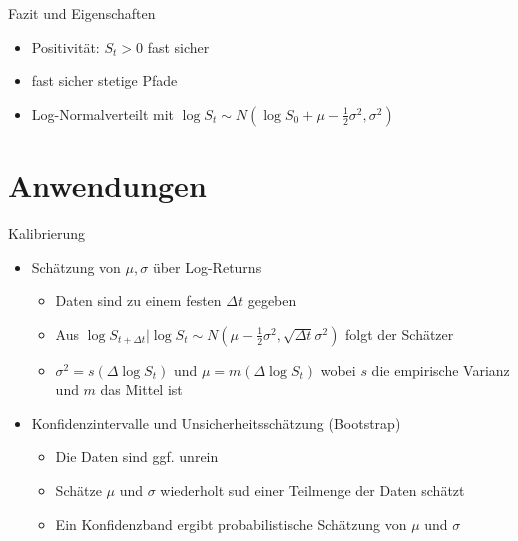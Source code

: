 \documentclass{beamer}
\begin{document}
\begin{frame}{Fazit und Eigenschaften}
  \begin{itemize}
      \item Positivität: $S_t>0$ fast sicher
      \item fast sicher stetige Pfade
      \item Log-Normalverteilt mit $\log S_t \sim N(\log S_0 + \mu - \tfrac12 \sigma^2, \sigma^2)$
  \end{itemize}
\end{frame}

\section{Anwendungen}

\begin{frame}{Kalibrierung}
  \begin{itemize}
      \item Schätzung von $\mu,\sigma$ über Log-Returns
      \begin{itemize}
        \item Daten sind zu einem festen $\Delta t$ gegeben
        \item Aus $\log S_{t + \Delta t} \vert \log S_t \sim N(\mu - \tfrac12 \sigma^2, \sqrt{\Delta t} \sigma^2)$ folgt der Schätzer
        \item $\sigma^2 = s(\Delta \log S_t)$ und $\mu = m(\Delta \log S_t)$ wobei $s$ die empirische Varianz und $m$ das Mittel ist
      \end{itemize}
      \pause
      \item Konfidenzintervalle und Unsicherheitsschätzung (Bootstrap)
      \begin{itemize}
        \item Die Daten sind ggf. unrein
        \item Schätze $\mu$ und $\sigma$ wiederholt sud einer Teilmenge der Daten schätzt
        \item Ein Konfidenzband ergibt probabilistische Schätzung von $\mu$ und $\sigma$
      \end{itemize}
  \end{itemize}
\end{frame}
\end{document}
